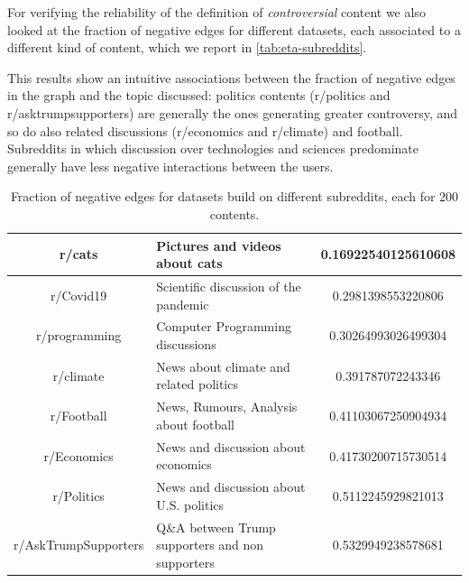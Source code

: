 \bigskip
For verifying the reliability of the definition of \emph{controversial} content
we also looked at the fraction of negative edges for different datasets, each
associated to a different kind of content, which we report in
\autoref{tab:eta-subreddits}.

This results show an intuitive associations between the fraction of negative edges in the
graph and the topic discussed: politics contents
(r/politics and r/asktrumpsupporters) are generally the ones generating greater
controversy, and so do also related discussions (r/economics and r/climate) and
football. Subreddits in which discussion over technologies and sciences
predominate generally have less negative interactions between the users.


\begin{table}
	\centering
	\caption[Fraction of negative edges in different subreddits]{Fraction of negative edges for datasets build on different
		subreddits, each for $200$ contents.}
	\label{tab:eta-subreddits}
	{\small
		\begin{tabular}{c | p{6cm} | c}
			r/cats               & Pictures and videos about cats                & \num{0.16922540125610608} \\
			\hline
			r/Covid19            & Scientific discussion of the pandemic         & \num{0.2981398553220806}  \\
			\hline
			r/programming        & Computer Programming discussions              & \num{0.30264993026499304} \\
			\hline
			r/climate            & News about climate and related politics       & \num{0.391787072243346}   \\
			\hline
			r/Football           & News, Rumours, Analysis about \mbox{football} & \num{0.41103067250904934} \\
			\hline
			r/Economics          & News and discussion about economics           & \num{0.41730200715730514} \\
			\hline
			r/Politics           & News and discussion about U.S. politics       & \num{0.5112245929821013}  \\
			\hline
			r/AskTrumpSupporters & {Q\&A between Trump supporters and non
			supporters}          & \num{0.5329949238578681}                                                  \\
		\end{tabular}
	}
\end{table}

